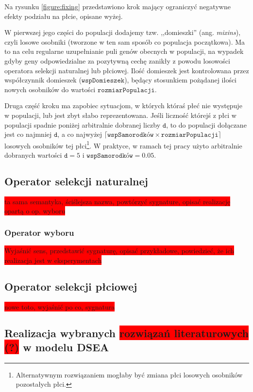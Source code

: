 \documentclass[twoside]{iisthesis}
\newcommand{\todo}{\colorbox{red}}
\newcommand{\param}[1]{\mathtt{#1}}
\begin{document}
Na rysunku \ref{figure:fixing} przedstawiono krok mający ograniczyć negatywne efekty podziału na płcie, opisane wyżej. 

W pierwszej jego części do populacji dodajemy tzw. ,,domieszki'' (ang. \emph{mixins}), czyli losowe osobniki (tworzone w ten sam sposób co populacja początkowa). Ma to na celu regularne uzupełnianie puli genów obecnych w populacji, na wypadek gdyby geny odpowiedzialne za pozytywną cechę zanikły z powodu losowości operatora selekcji naturalnej lub płciowej. Ilość domieszek jest kontrolowana przez współczynnik domieszek ($\param{wspDomieszek}$), będący stosunkiem pożądanej ilości nowych osobników do wartości $\param{rozmiarPopulacji}$.

Druga część kroku ma zapobiec sytuacjom, w których któraś płeć nie występuje w populacji, lub jest zbyt słabo reprezentowana. Jeśli liczność którejś z płci w populacji spadnie poniżej arbitralnie dobranej liczby $\param{d}$, to do populacji dołączane jest co najmniej $\param{d}$, a co najwyżej $\lceil \param{wspSamorodków} \times \param{rozmiarPopulacji} \rceil$ losowych osobników tej płci\footnote{Alternatywnym rozwiązaniem mogłaby być zmiana płci losowych osobników pozostałych płci.}. W praktyce, w ramach tej pracy użyto arbitralnie dobranych wartości $\param{d} = 5$ i $\param{wspSamorodków} = 0.05$.

\subsection{Operator selekcji naturalnej} \label{subsection:new_natSel}

\todo{ta sama semantyka, ściślejsza nazwa, powtórzyć sygnature, opisać realizację opartą o op. wyboru}

\subsubsection{Operator wyboru}

\todo{Wyjaśnić sens, przedstawić sygnaturę, opisać przykładowe, powiedzieć, że ich realizacja jest w eksperymentach}

\subsection{Operator selekcji płciowej} \label{subsection:new_genSel}

\todo{nowe toto, wyjaśnić po co, sygnatura}

\subsection{Realizacja wybranych \todo{rozwiązań literaturowych (?)} w modelu DSEA}
\end{document}
